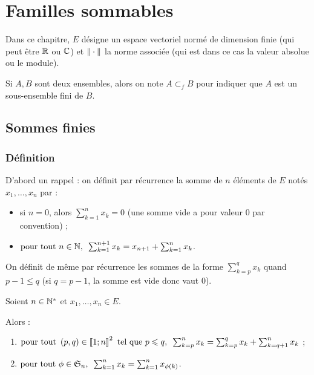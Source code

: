 \chapter{Familles sommables}

\minitoc

Dans ce chapitre, \(E\) désigne un espace vectoriel normé de dimension finie (qui peut être \(\mathbb{R}\) ou \(\mathbb{C}\)) et \(\norme{}\) la norme associée (qui est dans ce cas la valeur absolue ou le module).

Si \(A,B\) sont deux ensembles, alors on note \(A\subset_fB\) pour indiquer que \(A\) est un sous-ensemble fini de \(B\).

\section{Sommes finies}

\subsection{Définition}

D'abord un rappel : on définit par récurrence la somme de \(n\) éléments de \(E\) notés \(x_1,\dots,x_n\) par :

\begin{itemize}
    \item si \(n=0\), alors \(\sum_{k=1}^nx_k=0\) (une somme vide a pour valeur \(0\) par convention) ; \\
    \item \(\quantifs{\tpt n\in\N}\sum_{k=1}^{n+1}x_k=x_{n+1}+\sum_{k=1}^nx_k\).
\end{itemize}

On définit de même par récurrence les sommes de la forme \(\sum_{k=p}^qx_k\) quand \(p-1\leq q\) (si \(q=p-1\), la somme est vide donc vaut \(0\)).

\begin{prop}
Soient \(n\in\mathbb{N}^*\) et \(x_1,\dots,x_n\in E\).

Alors :

\begin{enumerate}
    \item \(\quantifs{\tpt\paren{p,q}\in\interventierii{1}{n}^2\text{ tel que }p\leq q}\sum_{k=p}^nx_k=\sum_{k=p}^qx_k+\sum_{k=q+1}^nx_k\) ; \\
    \item \(\quantifs{\tpt\phi\in\S{n}}\sum_{k=1}^nx_k=\sum_{k=1}^nx_{\phi\paren{k}}\).
\end{enumerate}
\end{prop}

